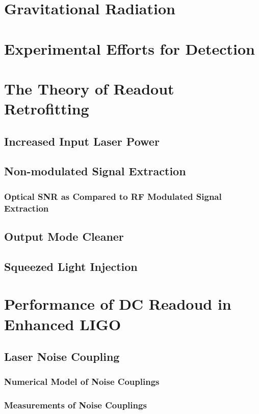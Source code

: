 \documentclass[12pt,vi,twoside]{mitthesis}
\begin{document}

\pagestyle{plain}

%


\chapter{Gravitational Radiation}

\chapter{Experimental Efforts for Detection}

\chapter{The Theory of Readout Retrofitting}
\section{Increased Input Laser Power}
\section{Non-modulated Signal Extraction}
\subsection{Optical SNR as Compared to RF Modulated Signal Extraction}
\section{Output Mode Cleaner}
\section{Squeezed Light Injection}

\chapter{Performance of DC Readoud in Enhanced LIGO}
\section{Laser Noise Coupling}
\subsection{Numerical Model of Noise Couplings}
\subsection{Measurements of Noise Couplings}
\end{document}
